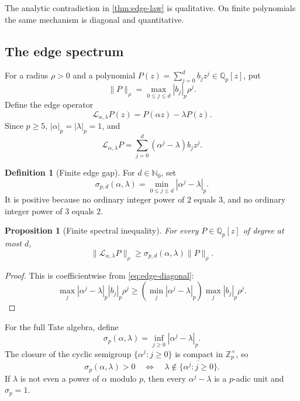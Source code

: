 \documentclass[11pt,oneside]{article}
\newtheorem{proposition}[theorem]{Proposition}
\theoremstyle{definition}
\newtheorem{definition}[theorem]{Definition}
\newcommand{\Nzero}{\mathbb N_0}
\newcommand{\Z}{\mathbb Z}
\newcommand{\Qp}{\mathbb Q_p}
\begin{document}
The analytic contradiction in \cref{thm:edge-law} is qualitative.  On finite polynomials the
same mechanism is diagonal and quantitative.

\subsection{The edge spectrum}

For a radius $\rho>0$ and a polynomial $P(z)=\sum_{j=0}^db_jz^j\in\Qp[z]$, put
\begin{equation}\label{eq:weighted-gauss}
 \lVert P\rVert_\rho=\max_{0\le j\le d}|b_j|_p\rho^j.
\end{equation}
Define the edge operator
\begin{equation}\label{eq:edge-operator}
 \mathcal L_{\alpha,\lambda}P(z)=P(\alpha z)-\lambda P(z).
\end{equation}
Since $p\ge5$, $|\alpha|_p=|\lambda|_p=1$, and
\begin{equation}\label{eq:edge-diagonal}
 \mathcal L_{\alpha,\lambda}P
 =\sum_{j=0}^d(\alpha^j-\lambda)b_jz^j.
\end{equation}

\begin{definition}[Finite edge gap]\label{def:finite-gap}
For $d\in\Nzero$, set
\begin{equation}\label{eq:sigma-d}
 \sigma_{p,d}(\alpha,\lambda)
 =\min_{0\le j\le d}|\alpha^j-\lambda|_p.
\end{equation}
It is positive because no ordinary integer power of $2$ equals $3$, and no ordinary integer
power of $3$ equals $2$.
\end{definition}

\begin{proposition}[Finite spectral inequality]\label{prop:finite-spectral}
For every $P\in\Qp[z]$ of degree at most $d$,
\begin{equation}\label{eq:finite-spectral}
 \lVert\mathcal L_{\alpha,\lambda}P\rVert_\rho
 \ge \sigma_{p,d}(\alpha,\lambda)\lVert P\rVert_\rho.
\end{equation}
\end{proposition}

\begin{proof}
This is coefficientwise from \eqref{eq:edge-diagonal}:
\[
 \max_j |\alpha^j-\lambda|_p|b_j|_p\rho^j
 \ge\left(\min_j|\alpha^j-\lambda|_p\right)
      \max_j|b_j|_p\rho^j.
\]
\end{proof}

For the full Tate algebra, define
\begin{equation}\label{eq:sigma-infty}
 \sigma_p(\alpha,\lambda)
 =\inf_{j\ge0}|\alpha^j-\lambda|_p.
\end{equation}
The closure of the cyclic semigroup $\{\alpha^j:j\ge0\}$ is compact in $\Z_p^\times$, so
\begin{equation}\label{eq:closure-criterion}
 \sigma_p(\alpha,\lambda)>0
 \quad\Longleftrightarrow\quad
 \lambda\notin\overline{\{\alpha^j:j\ge0\}}.
\end{equation}
If $\lambda$ is not even a power of $\alpha$ modulo $p$, then every
$\alpha^j-\lambda$ is a $p$-adic unit and $\sigma_p=1$.
\end{document}
